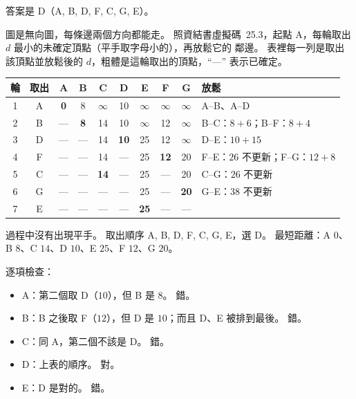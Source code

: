 \begin{pastsoln}
答案是 D（A, B, D, F, C, G, E）。

圖是無向圖，每條邊兩個方向都能走。 照資結書虛擬碼~25.3，起點 A，每輪取出 $d$ 最小的未確定頂點（平手取字母小的），再放鬆它的
鄰邊。 表裡每一列是取出該頂點並放鬆後的 $d$，粗體是這輪取出的頂點，``---'' 表示已確定。
\begin{center}
\small
\begin{tabular}{cc*{7}{c}l}
\toprule
輪 & 取出 & A & B & C & D & E & F & G & 放鬆 \\
\midrule
1 & A & \textbf{0} & 8 & $\infty$ & 10 & $\infty$ & $\infty$ & $\infty$ & A--B、A--D \\
2 & B & --- & \textbf{8} & 14 & 10 & $\infty$ & 12 & $\infty$ & B--C：$8 + 6$；B--F：$8 + 4$ \\
3 & D & --- & --- & 14 & \textbf{10} & 25 & 12 & $\infty$ & D--E：$10 + 15$ \\
4 & F & --- & --- & 14 & --- & 25 & \textbf{12} & 20 & F--E：$26$ 不更新；F--G：$12 + 8$ \\
5 & C & --- & --- & \textbf{14} & --- & 25 & --- & 20 & C--G：$26$ 不更新 \\
6 & G & --- & --- & --- & --- & 25 & --- & \textbf{20} & G--E：$38$ 不更新 \\
7 & E & --- & --- & --- & --- & \textbf{25} & --- & --- & \\
\bottomrule
\end{tabular}
\end{center}
過程中沒有出現平手。 取出順序 A, B, D, F, C, G, E，選 D。 最短距離：A $0$、B $8$、C $14$、D $10$、E $25$、F $12$、G $20$。

逐項檢查：
\begin{itemize}
\item A：第二個取 D（$10$），但 B 是 $8$。 錯。
\item B：B 之後取 F（$12$），但 D 是 $10$；而且 D、E 被排到最後。 錯。
\item C：同 A，第二個不該是 D。 錯。
\item D：上表的順序。 對。
\item E：D 是對的。 錯。
\end{itemize}
\end{pastsoln}
